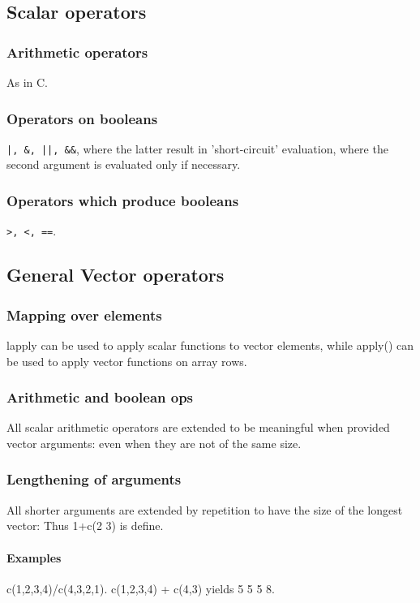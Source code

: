 \documentclass[oneside, article]{memoir}
\begin{document}
\subsection{Scalar operators}
\subsubsection{Arithmetic operators}
As in C.

\subsubsection{Operators on booleans}
\verb'|, &, ||, &&',  where the latter result in 'short-circuit' evaluation, where the second argument is evaluated only if necessary.

\subsubsection{Operators which produce booleans}
\verb'>, <, =='.

\subsection{General Vector operators}
\subsubsection{Mapping over elements}
lapply can be used to apply scalar functions to vector elements, while apply() can be used to apply vector functions on array rows.

\subsubsection{Arithmetic and boolean ops}
All scalar arithmetic operators are extended to be meaningful when provided vector arguments: even when they are not of the same size.

\subsubsection{Lengthening of arguments}
All shorter arguments are extended by repetition to have the size of the longest vector: Thus 1+c(2 3) is define.

\paragraph{Examples}
c(1,2,3,4)/c(4,3,2,1). c(1,2,3,4) + c(4,3) yields 5 5 5 8.
\end{document}
